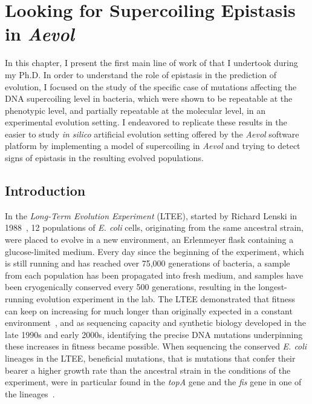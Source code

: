 \chapter{Looking for Supercoiling Epistasis in \emph{Aevol}}
\label{chap:aevol}

In this chapter, I present the first main line of work of that I undertook during my Ph.D.
In order to understand the role of epistasis in the prediction of evolution, I focused on the study of the specific case of mutations affecting the DNA supercoiling level in bacteria, which were shown to be repeatable at the phenotypic level,  and partially repeatable at the molecular level, in an experimental evolution setting.
I endeavored to replicate these results in the easier to study \emph{in silico} artificial evolution setting offered by the \emph{Aevol} software platform by implementing a model of supercoiling in \emph{Aevol} and trying to detect signs of epistasis in the resulting evolved populations.

\section{Introduction}
\label{sec:aevol:intro}

In the \emph{Long-Term Evolution Experiment} (LTEE), started by Richard Lenski in 1988~\citep{lenski1991}, 12 populations of \emph{E. coli} cells, originating from the same ancestral strain, were placed to evolve in a new environment, an Erlenmeyer flask containing a glucose-limited medium.
Every day since the beginning of the experiment, which is still running and has reached over 75,000 generations of bacteria, a sample from each population has been propagated into fresh medium, and samples have been cryogenically conserved every 500 generations, resulting in the longest-running evolution experiment in the lab.
The LTEE demonstrated that fitness can keep on increasing for much longer than originally expected in a constant environment~\citep{good2017}, and as sequencing capacity and synthetic biology developed in the late 1990s and early 2000s, identifying the precise DNA mutations underpinning these increases in fitness became possible.
When sequencing the conserved \emph{E. coli} lineages in the LTEE, beneficial mutations, that is mutations that confer their bearer a higher growth rate than the ancestral strain in the conditions of the experiment, were in particular found in the \emph{topA} gene  and the \emph{fis} gene in one of the lineages~\citep{crozat2005}.

